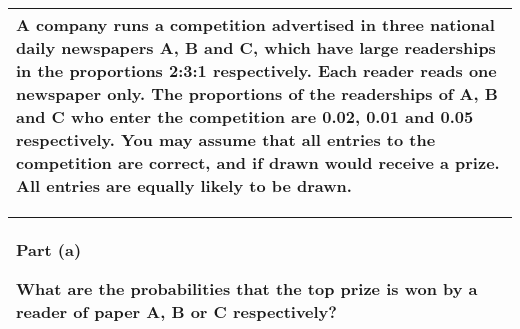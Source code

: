 \documentclass[a4paper,12pt]{article}
\begin{document}






\begin{table}[ht!]

     \centering

     \begin{tabular}{|p{15cm}|}

     \hline        
A company runs a competition advertised in three national daily newspapers A, B and
C, which have large readerships in the proportions 2:3:1 respectively. Each reader
reads one newspaper only. The proportions of the readerships of A, B and C who enter
the competition are 0.02, 0.01 and 0.05 respectively. You may assume that all entries
to the competition are correct, and if drawn would receive a prize. All entries are
equally likely to be drawn.

\\ \hline

      \end{tabular}

    \end{table}

    


\begin{table}[ht!]

     \centering

     \begin{tabular}{|p{15cm}|}

     \hline        

\noindent \textbf{Part (a)}

\noindent What are the probabilities that the top prize is won by a reader of paper A, B or C
respectively?


\\ \hline

      \end{tabular}

    \end{table}
\end{document}
